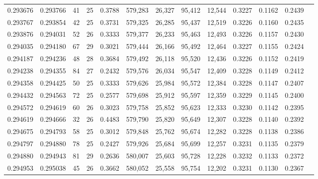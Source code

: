 \begin{tabular}{rrrrrrrrrrrrr}
0.293676 & 0.293766 &  41 &  25 &                                     0.3788 & 579,283 &  26,327 &  95,412 &  12,544 & 0.3227 & 0.1162 & 0.2439 \\
0.293767 & 0.293854 &  42 &  25 &                                     0.3731 & 579,325 &  26,285 &  95,437 &  12,519 & 0.3226 & 0.1160 & 0.2435 \\
0.293876 & 0.294031 &  52 &  26 &                                     0.3333 & 579,377 &  26,233 &  95,463 &  12,493 & 0.3226 & 0.1157 & 0.2430 \\
0.294035 & 0.294180 &  67 &  29 &                                     0.3021 & 579,444 &  26,166 &  95,492 &  12,464 & 0.3227 & 0.1155 & 0.2424 \\
0.294187 & 0.294236 &  48 &  28 &                                     0.3684 & 579,492 &  26,118 &  95,520 &  12,436 & 0.3226 & 0.1152 & 0.2419 \\
0.294238 & 0.294355 &  84 &  27 &                                     0.2432 & 579,576 &  26,034 &  95,547 &  12,409 & 0.3228 & 0.1149 & 0.2412 \\
0.294358 & 0.294425 &  50 &  25 &                                     0.3333 & 579,626 &  25,984 &  95,572 &  12,384 & 0.3228 & 0.1147 & 0.2407 \\
0.294432 & 0.294563 &  72 &  25 &                                     0.2577 & 579,698 &  25,912 &  95,597 &  12,359 & 0.3229 & 0.1145 & 0.2400 \\
0.294572 & 0.294619 &  60 &  26 &                                     0.3023 & 579,758 &  25,852 &  95,623 &  12,333 & 0.3230 & 0.1142 & 0.2395 \\
0.294619 & 0.294666 &  32 &  26 &                                     0.4483 & 579,790 &  25,820 &  95,649 &  12,307 & 0.3228 & 0.1140 & 0.2392 \\
0.294675 & 0.294793 &  58 &  25 &                                     0.3012 & 579,848 &  25,762 &  95,674 &  12,282 & 0.3228 & 0.1138 & 0.2386 \\
0.294797 & 0.294880 &  78 &  25 &                                     0.2427 & 579,926 &  25,684 &  95,699 &  12,257 & 0.3231 & 0.1135 & 0.2379 \\
0.294880 & 0.294943 &  81 &  29 &                                     0.2636 & 580,007 &  25,603 &  95,728 &  12,228 & 0.3232 & 0.1133 & 0.2372 \\
0.294953 & 0.295038 &  45 &  26 &                                     0.3662 & 580,052 &  25,558 &  95,754 &  12,202 & 0.3231 & 0.1130 & 0.2367 \\

\end{tabular}
